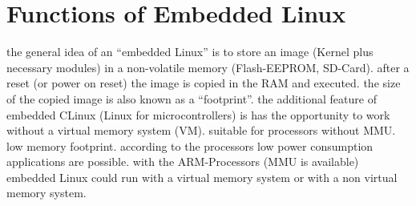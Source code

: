 \section{Functions of Embedded Linux}
\bi
	\ite the general idea of an ``embedded Linux'' is to store an image (Kernel plus necessary modules) in a non-volatile memory (Flash-EEPROM, SD-Card).
	\ite after a reset (or power on reset) the image is copied in the RAM and executed.
	\ite the size of the copied image is also known as a ``footprint''.
	\ite the additional feature of embedded CLinux (Linux for microcontrollers) is has the opportunity to work without a virtual memory system (VM).
	\bi
		\ite suitable for processors without MMU.
		\ite low memory footprint.
		\ite according to the processors low power consumption applications are possible.
	\ei
	\bigskip
	\ite with the ARM-Processors (MMU is available)  embedded Linux could run with a virtual memory system or with a non virtual memory system.
\ei
\os{\newpage}
